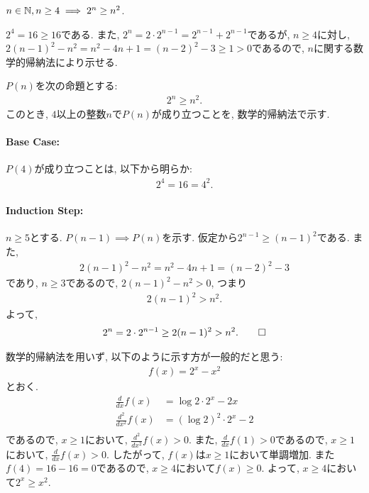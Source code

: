 \begin{prop}
  \label{p:20230815}
  $n\in\mathbb{N}, n\geq 4\implies 2^n\geq n^2$.
\end{prop}
\begin{proof**}
  $2^4=16\geq 16$である.
  また,
  $2^n=2\cdot 2^{n-1}=2^{n-1}+2^{n-1}$であるが,
  $n\geq 4$に対し,
  $2(n-1)^2-n^2=n^2-4n+1=(n-2)^2-3\geq 1>0$であるので,
  $n$に関する数学的帰納法により示せる.
\end{proof**}
\begin{proof*}
  $P(n)$を次の命題とする:
  \begin{align*}
    2^n\geq n^2
    .
  \end{align*}
  このとき,
  $4$以上の整数$n$で$P(n)$が成り立つことを,
  数学的帰納法で示す.

  \paragraph{Base Case:}
  $P(4)$が成り立つことは, 以下から明らか:
  \begin{align*}
    2^4=16=4^2.
  \end{align*}
  \paragraph{Induction Step:}
  $n\geq 5$とする.
  $P(n-1)\implies P(n)$を示す.
  仮定から$2^{n-1}\geq (n-1)^2$である.
  また,
  \begin{align*}
    2(n-1)^2-n^2=n^2-4n+1=(n-2)^2-3
  \end{align*}
  であり,
  $n\geq 3$であるので,
  $2(n-1)^2-n^2>0$, つまり
  \begin{align*}
    2(n-1)^2>n^2.
  \end{align*}
  よって,
  \begin{align*}
    2^n=2\cdot 2^{n-1}\geq 2(n-1)^2>n^2
    .\qedhere
  \end{align*}
\end{proof*}

\begin{rem}
  数学的帰納法を用いず, 以下のように示す方が一般的だと思う:
  \begin{align*}
    f(x)=2^x-x^2
  \end{align*}
  とおく.
  \begin{align*}
    \frac{d}{dx}f(x)&=\log 2 \cdot 2^x-2x\\
    \frac{d^2}{dx^2}f(x)&=(\log 2)^2 \cdot 2^x-2\\
  \end{align*}
  であるので, $x\geq 1$において,
  $\frac{d^2}{dx^2}f(x)>0$.
  また, $\frac{d}{dx}f(1)>0$であるので,
  $x\geq 1$において,
  $\frac{d}{dx}f(x)> 0$.
  したがって, $f(x)$は$x\geq 1$において単調増加.
  また$f(4)=16-16=0$であるので,
  $x\geq 4$において$f(x) \geq 0$.
  よって, $x\geq 4$において$2^x\geq x^2$.
\end{rem}

